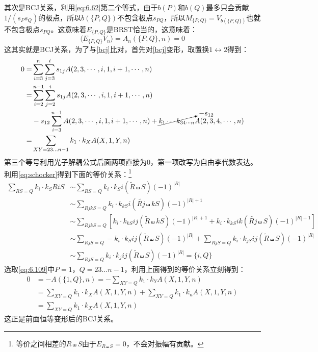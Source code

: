 其次是BCJ关系，利用\ref{eq:6.62}第二个等式，由于$b(P)$和$b(Q)$最多只会贡献$1/(s_Ps_Q)$的极点，所以$b(\{P,Q\})$不包含极点$s_{PQ}$，所以$M_{\{P,Q\}}=V_{b(\{P,Q\})}$也就不包含极点$s_{PQ}$。这意味着$E_{\{P,Q\}}$是BRST恰当的，这意味着：
\begin{equation}
	\label{eq:6.109}
	\langle E_{\{P,Q\}}V_n\rangle = A_n(\{P,Q\},n) = 0
\end{equation}
这其实就是BCJ关系，为了与\ref{bcj}比对，首先对\ref{bcj}变形，取置换$1\leftrightarrow2$得到：
\begin{equation}
	\begin{aligned}
		0=&\sum_{i=3}^n\sum_{j=3}^i s_{1j}A(2,3,\cdots ,i,1, i+1,\cdots,n)\\
		=&\sum_{i=2}^{n-1}\sum_{j=2}^is_{1j}A(2,3,\cdots,i,1,i+1,\cdots ,n)\\
		&-s_{12}\sum_{i=3}^{n-1}A(2,3,\cdots ,i,1,i+1,\cdots, n )+\cancelto{-s_{12}}{k_1\cdots k_{34\cdots n}}A(2,3,4,\cdots ,n)\\
		=&\sum_{XY=23...n-1}k_1\cdot k_XA(X,1,Y,n)
	\end{aligned}
\end{equation}
第三个等号利用光子解耦公式后面两项直接为$0$，第一项改写为自由李代数表达。利用\ref{eq:schocker}得到下面的等价关系：\footnote{等价之间相差的$R\shuffle S$由于$E_{R\shuffle S} = 0$，不会对振幅有贡献。}
\begin{align*}
		\sum_{RS=Q}k_i\cdot k_SRiS&\sim\sum_{RS=Q}k_i\cdot k_Si(\tilde{R}\shuffle S)(-1)^{|R|}\\&\sim\sum_{RjkS=Q}k_i\cdot k_{kS}i(\widetilde{Rj}\shuffle kS)(-1)^{|R|+1}\\&\sim\sum_{RjkS=Q}\left[k_i\cdot k_{kS}ij(\tilde{R}\shuffle kS)(-1)^{|R|+1}+k_i\cdot k_{kS}ik(\widetilde{Rj}\shuffle S)(-1)^{|R|+1}\right]\\
		&\sim\sum_{RjS=Q}-k_i\cdot k_Sij(\tilde{R}\shuffle S)(-1)^{|R|}+\sum_{RjS=Q}k_i\cdot k_{jS}ij(\tilde{R}\shuffle S)(-1)^{|R|}\\&\sim\sum_{RjS=Q}k_i\cdot k_jij(\tilde{R}\shuffle S)(-1)^{|R|}
		=\{i,Q\}
\end{align*}
选取\ref{eq:6.109}中$P=1$，$Q=23\ldots n-1$，利用上面得到的等价关系立刻得到：
\begin{equation}
	\begin{aligned}
		\mathrm{0}&=-A(\{1,Q\},n)=-\sum_{XY=Q}k_1\cdot k_YA(X,1,Y,n)\\&=\sum_{XY=Q}k_1\cdot k_XA(X,1,Y,n)+\sum_{XY=Q}k_1\cdot k_nA(X,1,Y,n)\\&=\sum_{XY=Q}k_1\cdot k_XA(X,1,Y,n)
	\end{aligned}
\end{equation}
这正是前面恒等变形后的BCJ关系。
